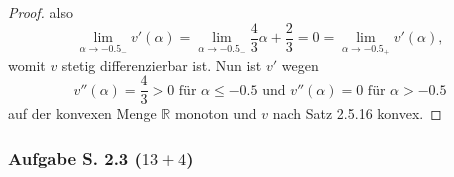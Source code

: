 \documentclass[12pt]{extreport} %
\newcommand{\R}{\mathbb{R}}
\theoremstyle{named}
\theoremstyle{nnamed}
\theoremstyle{itshape}
\theoremstyle{normal}
\begin{document}
\begin{enumerate}
\begin{proof}
			also 
			$$\lim_{\alpha \rightarrow -0.5_{-}} v'(\alpha) = \lim_{\alpha \rightarrow -0.5_{-}} \frac{4}{3} \alpha  + \frac{2}{3} = 0 = \lim_{\alpha \rightarrow -0.5_{+}} v'(\alpha), $$
			womit $v$ stetig differenzierbar ist. Nun ist $v'$ wegen 
			$$ v''(\alpha)=\frac{4}{3} > 0 \text{ für } \alpha \leq - 0.5 \text{ und } v''(\alpha) = 0 \text{ für } \alpha > - 0.5 $$
			auf der konvexen Menge $\R$ monoton und $v$ nach Satz 2.5.16 konvex.
		\end{proof}
\end{enumerate}
 
\newpage

\subsubsection{Aufgabe S. 2.3 (\textit{$13 + 4$})}
\end{document}
